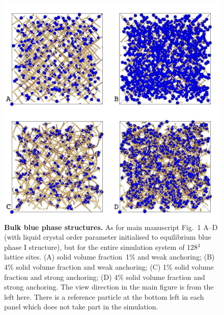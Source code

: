 \documentclass[12pt,twoside]{article}
\begin{document}
\begin{figure}[!h]
\begin{center}
\includegraphics[scale=0.35]{support-fig2.pdf}
\end{center}
\caption{\textbf{Bulk blue phase structures.}
As for main manuscript Fig.~1 A--D
(with liquid crystal order parameter
initialised to equilibrium blue phase I structure), but for the entire
simulation system of 128$^3$ lattice sites. (A)  solid volume fraction~1\%
and weak anchoring;  (B) 4\% solid volume fraction and weak anchoring;
(C) 1\% solid volume fraction and strong anchoring; (D) 4\% solid
volume fraction and strong anchoring. The view direction in the
main figure is from the left here. There is a reference
particle at the bottom left in each panel which does not take part
in the simulation.}
\end{figure}

\newpage
\end{document}
